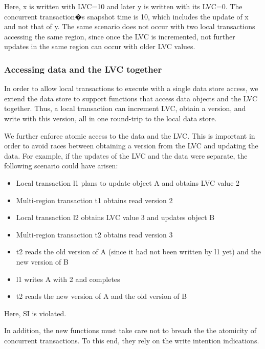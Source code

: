 Here, x is written with LVC=10 and later y is written with its LVC=0. The
concurrent transaction�s snapshot time is 10, which includes the update of x and
not that of y. The same scenario does not occur with two local transactions
accessing the same region, since once the LVC is incremented, not further
updates in the same region can occur with older LVC values.

\subsubsection{Accessing data and the LVC together}
In order to allow local transactions to execute with a single data store access,
we extend the data store to support functions that access data objects and the
LVC together. Thus, a local transaction can increment LVC, obtain a version, and
write with this version, all in one round-trip to the local data store.

We further enforce atomic access to the data and the LVC. This is important in
order to avoid races between obtaining a version from the LVC and updating the
data. For example, if the updates of the LVC and the data were separate, the
following scenario could have arisen:
\begin{itemize}
  \item Local transaction l1 plans to update object A and obtains LVC value 2
  \item Multi-region transaction t1 obtains read version 2
  \item Local transaction l2 obtains LVC value 3 and updates object B
  \item Multi-region transaction t2 obtains read version 3
  \item t2 reads the old version of A (since it had not been written by l1 yet)
  and the new version of  B
  \item l1 writes A with 2 and completes
  \item t2 reads the new version of A and the old version of  B
\end{itemize}
Here, SI is violated.

In addition, the new functions must take care not to breach the the atomicity of
concurrent transactions. To this end, they rely on the write intention indications.

